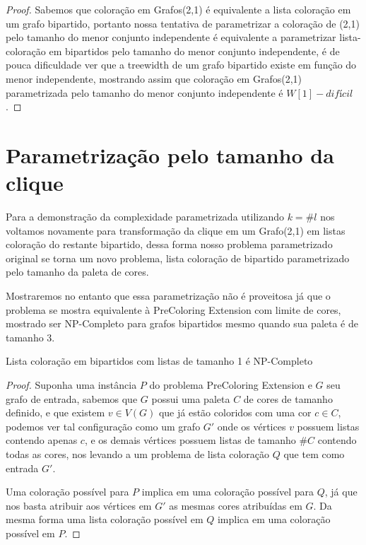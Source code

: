 \begin{proof}
Sabemos que coloração em Grafos(2,1) é equivalente a lista coloração em um grafo bipartido, portanto nossa tentativa de parametrizar a coloração de (2,1) pelo tamanho do menor conjunto independente é equivalente a parametrizar lista-coloração em bipartidos pelo tamanho do menor conjunto independente, é de pouca dificuldade ver que a treewidth de um grafo bipartido existe em função do menor independente, mostrando assim que coloração em Grafos(2,1) parametrizada pelo tamanho do menor conjunto independente é $W[1]-difícil$. 

\end{proof}

\section{Parametrização pelo tamanho da clique}
Para a demonstração da complexidade parametrizada utilizando $k=\#l$ nos voltamos novamente para transformação da clique em um Grafo(2,1) em listas coloração do restante bipartido, dessa forma nosso problema parametrizado original se torna um novo problema, lista coloração de bipartido parametrizado pelo tamanho da paleta de cores. 

Mostraremos no entanto que essa parametrização não é proveitosa já que o problema se mostra equivalente à PreColoring Extension com limite de cores, mostrado ser NP-Completo para grafos bipartidos mesmo quando sua paleta é de tamanho 3\cite{Kratochvil94}.

\begin{teorema}
Lista coloração em bipartidos com listas de tamanho 1 é NP-Completo
\end{teorema}
\begin{proof}
Suponha uma instância $P$ do problema PreColoring Extension e $G$ seu grafo de entrada, sabemos que $G$ possui uma paleta $C$ de cores de tamanho definido, e que existem $v \in V(G)$ que já estão coloridos com uma cor $c \in C$, podemos ver tal configuração como um grafo $G'$ onde os vértices $v$ possuem listas contendo apenas $c$, e os demais vértices possuem listas de tamanho $\#C$ contendo todas as cores, nos levando a um problema de lista coloração $Q$ que tem como entrada $G'$.

Uma coloração possível para $P$ implica em uma coloração possível para $Q$, já que nos basta atribuir aos vértices em $G'$ as mesmas cores atribuídas em $G$. Da mesma forma uma lista coloração possível em $Q$ implica em uma coloração possível em $P$.
\end{proof}


